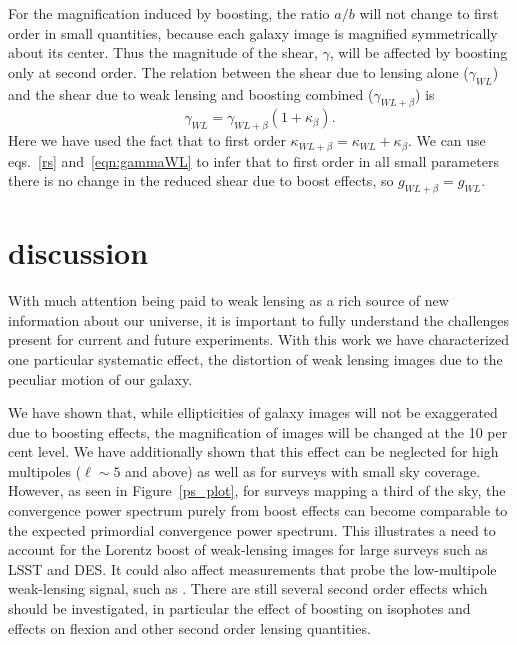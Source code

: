 \documentclass[useAMS,fleqn, usenatbib]{mn2e}
\begin{document}
For the  magnification induced by boosting, 
the ratio $a/b$ will not change to first order in small quantities, because each
galaxy image is magnified symmetrically about its center. Thus
the magnitude of the shear, $\gamma$, will be affected by boosting only at second order. The relation between the shear due to  lensing alone ($\gamma_{WL}$) and the shear
due to weak lensing and boosting combined ($\gamma_{WL+\beta}$) is
\begin{equation}
\label{eqn:gammaWL}
\gamma_{WL}=\gamma_{WL+\beta}\left(1+\kappa_{\beta}\right).
\end{equation}
Here we have used the fact that to first order $\kappa_{WL+\beta}=\kappa_{WL}+\kappa_{\beta}$.
We can use  eqs.~\ref{rs} and~\ref{eqn:gammaWL} to infer that to first order in all
small parameters there is no change in the reduced shear
due to boost effects, so $g_{WL+\beta}=g_{WL}$.



\section{discussion}
\label{discussion}

With much attention being paid to weak lensing as a rich source of new
information about our universe, it is important to fully understand the 
challenges present for current and future experiments. With this work we have
characterized one particular systematic effect, the distortion of weak
lensing images due to the peculiar motion of our galaxy.

We have shown that, while ellipticities of galaxy images will not be exaggerated
due to boosting effects, the magnification of images will be changed at the 10 per cent
level. We have additionally shown that this effect can be neglected for high 
multipoles ($\ell\sim 5$ and above) as well as for surveys with small sky coverage.
However, as seen in Figure~\ref{ps_plot}, for surveys mapping a third of the 
sky, the convergence power spectrum purely from boost effects can become comparable to the expected 
primordial convergence power spectrum. This illustrates a need to account for the Lorentz
boost of weak-lensing images for large surveys such as LSST and DES. It could also affect measurements that probe the low-multipole weak-lensing signal, such as \citep{Kesden:2003zm}.   There are 
still several second order effects which should be investigated, in
particular the effect of boosting on isophotes and effects on flexion and other second
order lensing quantities.  
\end{document}
